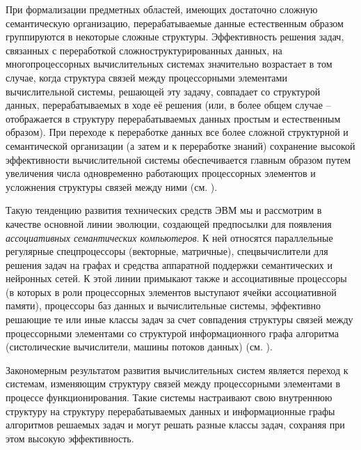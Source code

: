 При формализации предметных областей, имеющих достаточно сложную семантическую организацию, перерабатываемые данные естественным образом группируются в некоторые сложные структуры. Эффективность решения задач, связанных с переработкой сложноструктурированных данных, на многопроцессорных вычислительных системах значительно возрастает в том случае, когда структура связей между процессорными элементами вычислительной системы, решающей эту задачу, совпадает со структурой данных, перерабатываемых в ходе её решения (или, в более общем случае -- отображается в структуру перерабатываемых данных простым и естественным образом). При переходе к переработке данных все более сложной структурной и семантической организации (а затем и к переработке знаний) сохранение высокой эффективности вычислительной системы обеспечивается главным образом путем увеличения числа одновременно работающих процессорных элементов и усложнения структуры связей между ними (см. ).

Такую тенденцию развития технических средств ЭВМ мы и рассмотрим в качестве основной линии эволюции, создающей предпосылки для появления \textit{ассоциативных семантических компьютеров}. К ней относятся параллельные регулярные спецпроцессоры (векторные, матричные), спецвычислители для решения задач на графах и средства аппаратной поддержки семантических и нейронных сетей. К этой линии примыкают также и ассоциативные процессоры (в которых в роли процессорных элементов выступают ячейки ассоциативной памяти), процессоры баз данных и вычислительные системы, эффективно решающие те или иные классы задач за счет совпадения структуры связей между процессорными элементами со структурой информационного графа алгоритма (систолические вычислители, машины потоков данных) (см. ).

Закономерным результатом развития вычислительных систем является переход к системам, изменяющим структуру связей между процессорными элементами в процессе функционирования. Такие системы настраивают свою внутреннюю структуру на структуру перерабатываемых данных и информационные графы алгоритмов решаемых задач и могут решать разные классы задач, сохраняя при этом высокую эффективность.

